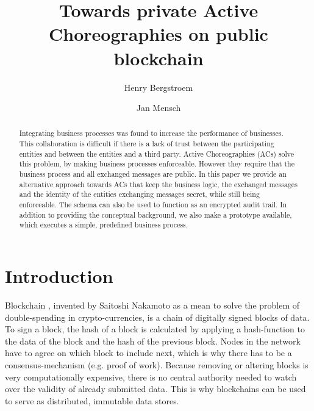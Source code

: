 \documentclass[runningheads]{llncs}
\begin{document}
%
\title{Towards private Active Choreographies on public blockchain}
%
%
\author{Henry Bergstroem \and
Jan Mensch}
%
%


%
\maketitle              %
%
\begin{abstract}


Integrating business processes was found to increase the performance of businesses. This collaboration is difficult if there is a lack of trust between the participating entities and between the entities and a third party. Active Choreographies (ACs) solve this problem, by making business processes enforceable. However they require that the business process and all exchanged messages are public. In this paper we provide an alternative approach towards ACs that keep the business logic, the exchanged messages and the identity of the entities exchanging messages secret, while still being enforceable. The schema can also be used to function as an encrypted audit trail. In addition to providing the conceptual background, we also make a prototype available, which executes a simple, predefined business process.


\end{abstract}



\section{Introduction} \label{intro}

Blockchain \cite{nakamoto2008bitcoin}, invented by Saitoshi Nakamoto as a mean to solve the problem of double-spending in crypto-currencies, is a chain of digitally signed blocks of data. To sign a block, the hash of a block is calculated by applying a hash-function to the data of the block and the hash of the previous block. Nodes in the network have to agree on which block to include next, which is why there has to be a consensus-mechanism (e.g. proof of work). Because removing or altering blocks is very computationally expensive, there is no central authority needed to watch over the validity of already submitted data. This is why blockchains can be used to serve as distributed, immutable data stores.
\end{document}
